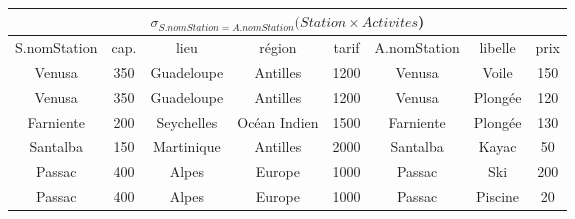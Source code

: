 \begin{slide}

{\tt
\begin{center}
\begin{tabular}{|c|c|c|c|c|c|c|c|}\hline
\multicolumn{8}{|c|}{$\sigma_{S.nomStation=A.nomStation} (Station \times Activites$)}\\\hline \hline
S.nomStation & cap. & lieu & r\'egion & tarif & A.nomStation &
    libelle & prix \\ \hline
Venusa & 350 & Guadeloupe & Antilles & 1200 & Venusa & Voile & 150\\
Venusa & 350 & Guadeloupe & Antilles & 1200 & Venusa & Plong\'ee & 120\\
Farniente & 200 & Seychelles & Oc\'ean Indien & 1500 & Farniente & Plong\'ee & 130\\
Santalba & 150 & Martinique & Antilles & 2000 & Santalba & Kayac & 50\\
Passac & 400 & Alpes & Europe & 1000  & Passac & Ski & 200\\
Passac & 400 & Alpes & Europe & 1000  & Passac & Piscine & 20\\\hline
\end{tabular}
\end{center}
}

\end{slide}

